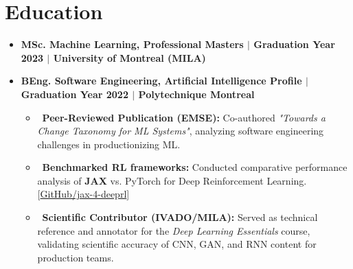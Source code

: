 \documentclass[letterpaper,10pt]{article}
\newcommand{\resumeItem}[1]{\item\small{#1}}
\newcommand{\resumeSubheading}[4]{
  \vspace{-1pt}
  \item \textbf{#1, #2 $|$ #3 $|$ #4}
}
\newcommand{\resumeSubHeadingList}{\begin{itemize}[leftmargin=0.15in, label={}]}
\newcommand{\resumeSubHeadingListEnd}{\end{itemize}}
\begin{document}
\section{Education}
\resumeSubHeadingList
  \resumeSubheading
  {MSc. Machine Learning}{Professional Masters}{Graduation Year 2023}{University of Montreal (MILA)}{}
    \resumeSubheading
    {BEng. Software Engineering}{Artificial Intelligence Profile}{Graduation Year 2022}{Polytechnique Montreal}{}
    \resumeSubHeadingList
        \resumeItem{\textbullet\ \textbf{Peer-Reviewed Publication (EMSE):} Co-authored \textit{"Towards a Change Taxonomy for ML Systems"}, analyzing software engineering challenges in productionizing ML.}
        \resumeItem{\textbullet\ \textbf{Benchmarked RL frameworks:} Conducted comparative performance analysis of \textbf{JAX} vs. PyTorch for Deep Reinforcement Learning. [\href{https://github.com/williamGlazer/jax-4-deeprl/blob/main/report.pdf}{GitHub/jax-4-deeprl}]}
        \resumeItem{\textbullet\ \textbf{Scientific Contributor (IVADO/MILA):} Served as technical reference and annotator for the \textit{Deep Learning Essentials} course, validating scientific accuracy of CNN, GAN, and RNN content for production teams.}
    \resumeSubHeadingListEnd
\resumeSubHeadingListEnd
\end{document}
